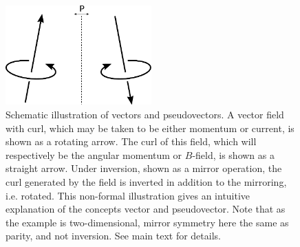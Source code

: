 \begin{figure}[h]
  \centering
  \includegraphics[width=0.5\textwidth]{figures/pseudovector}
  \caption{Schematic illustration of vectors and pseudovectors.
    A vector field with curl, which may be taken to be either momentum or current, is shown as a rotating arrow.
    The curl of this field, which will respectively be the angular  momentum or $B$-field, is shown as a straight arrow.
    Under inversion, shown as a mirror operation, the curl generated by the field is inverted in addition to the mirroring, i.e. rotated.
    This non-formal illustration gives an intuitive explanation of the concepts vector and pseudovector.
    Note that as the example is two-dimensional, mirror symmetry here the same as parity, and not inversion.
    See main text for details.
  }
  \label{fig:pseudovector}
\end{figure}
